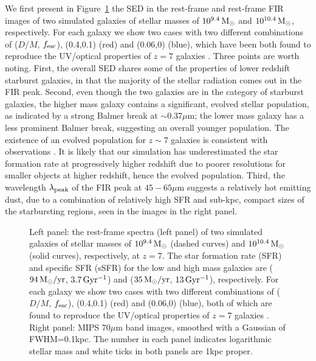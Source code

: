 We first present in Figure~\ref{fig:galsed} the SED in the rest-frame and 
rest-frame FIR images of two simulated galaxies of stellar masses of $10^{9.4}{\rm\,M_\odot}$ and $10^{10.4}{\rm\,M_\odot}$, respectively.
For each galaxy we show two cases with two different combinations of ($D/M$, $f_{\rm esc}$), (0.4,0.1) (red) and (0.06,0) (blue),
which have been both found to reproduce the UV/optical properties of $z=7$ galaxies \citep{2013Kimm}.
Three points are worth noting.
First, the overall SED shares some of the properties of lower redshift starburst galaxies,
in that the majority of the stellar radiation comes out in the FIR peak.
Second, even though the two galaxies are in the category of starburst galaxies,
the higher mass galaxy contains a significant, evolved stellar population, as indicated by a strong Balmer break at $\sim 0.37\mu$m;
the lower mass galaxy has a less prominent Balmer break, suggesting an overall younger population.
The existence of an evolved population for $z\sim 7$ galaxies is consistent with observations \citep[e.g.,][]{2010Labbe}.
It is likely that our simulation has underestimated the star formation rate at progressively higher redshift
due to poorer resolutions for smaller objects at higher redshift, hence the evolved population.
Third, the wavelength $\lambda_{\rm peak}$ of the FIR peak at $45-65\mu$m suggests a relatively hot emitting dust,
due to a combination of relatively high SFR and sub-kpc, compact sizes of the starbursting regions,
seen in the images in the right panel.



\begin{figure}[!h]
\centering
\vskip 0.5cm
\hskip -1cm
\hskip -0cm
\vskip -0cm
\caption{%
Left panel: the rest-frame spectra (left panel) of two simulated galaxies of stellar masses of $10^{9.4}{\rm\,M_\odot}$ (dashed curves)
and $10^{10.4}{\rm\,M_\odot}$ (solid curves), respectively, at $z=7$.
The star formation rate (SFR) and specific SFR (sSFR) for the low and high mass galaxies 
are (${\rm 94\,M_{\odot}/yr}$, ${\rm 3.7\,Gyr^{-1}}$) and (${\rm 35\,M_{\odot}/yr}$, ${\rm 13\,Gyr^{-1}}$), respectively.
For each galaxy we show two cases with two different combinations of ($D/M$, $f_{\rm esc}$), (0.4,0.1) (red) and (0.06,0) (blue),
both of which are found to reproduce the UV/optical properties of $z=7$ galaxies \citep{2013Kimm}.
Right panel: MIPS 70$\mu$m band images, smoothed with a Gaussian of FWHM=0.1kpc.
The number in each panel indicates logarithmic stellar mass and white ticks in both panels are 1kpc proper.
}
\label{fig:galsed}
\end{figure}


